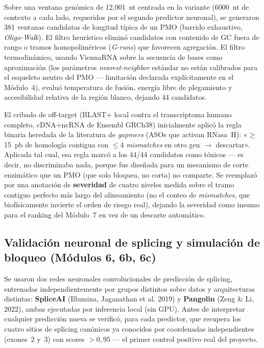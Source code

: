 \documentclass[11pt,a4paper]{article}
\begin{document}
Sobre una ventana genómica de 12{,}001~nt centrada en la variante (6000~nt de contexto a cada lado, requeridos por el segundo predictor neuronal), se generaron 381 ventanas candidatas de longitud típica de un PMO (barrido exhaustivo, \emph{Oligo-Walk}). El filtro heurístico eliminó candidatos con contenido de GC fuera de rango o tramos homopoliméricos (\emph{G-runs}) que favorecen agregación. El filtro termodinámico, usando ViennaRNA sobre la secuencia de bases como aproximación (los parámetros \emph{nearest-neighbor} estándar no están calibrados para el esqueleto neutro del PMO --- limitación declarada explícitamente en el Módulo~4), evaluó temperatura de fusión, energía libre de plegamiento y accesibilidad relativa de la región blanco, dejando 44 candidatos.

El cribado de off-target (BLAST+ local contra el transcriptoma humano completo, cDNA+ncRNA de Ensembl GRCh38) inicialmente aplicó la regla binaria heredada de la literatura de \emph{gapmers} (ASOs que activan RNasa~H): «$\geq$15~pb de homología contigua con $\leq$4 \emph{mismatches} en otro gen $\rightarrow$ descartar». Aplicada tal cual, esa regla marcó a los 44/44 candidatos como tóxicos --- es decir, no discriminaba nada, porque fue diseñada para un mecanismo de corte enzimático que un PMO (que solo bloquea, no corta) no comparte. Se reemplazó por una anotación de \textbf{severidad} de cuatro niveles medida sobre el tramo contiguo perfecto más largo del alineamiento (no el conteo de \emph{mismatches}, que biofísicamente invierte el orden de riesgo real), dejando la severidad como insumo para el ranking del Módulo~7 en vez de un descarte automático.

\subsection{Validación neuronal de splicing y simulación de bloqueo (Módulos 6, 6b, 6c)}

Se usaron dos redes neuronales convolucionales de predicción de splicing, entrenadas independientemente por grupos distintos sobre datos y arquitecturas distintas: \textbf{SpliceAI} (Illumina, Jaganathan et al. 2019) y \textbf{Pangolin} (Zeng \& Li, 2022), ambas ejecutadas por inferencia local (sin GPU). Antes de interpretar cualquier predicción nueva se verificó, para cada predictor, que recupera los cuatro sitios de splicing canónicos ya conocidos por coordenadas independientes (exones~2 y~3) con scores $>0{,}95$ --- el primer control positivo real del proyecto.
\end{document}
